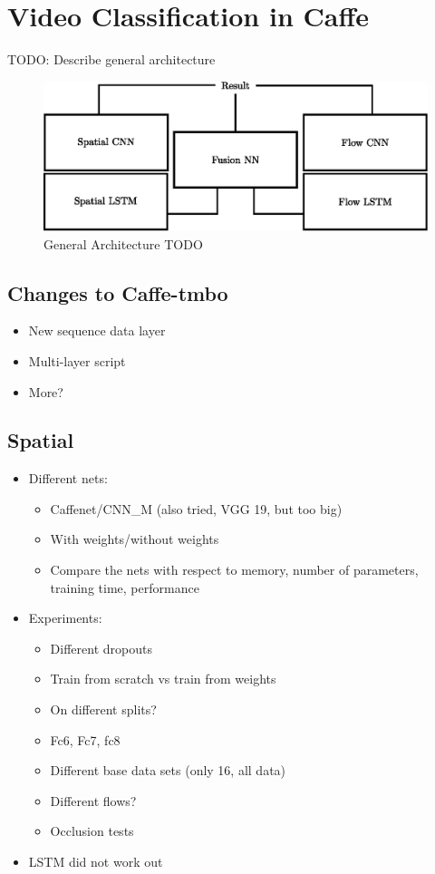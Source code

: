 \section{Video Classification in Caffe}
\label{sec:classification}

TODO: Describe general architecture
\begin{figure}[!htb]
	\centering
	\includegraphics[scale=.7]{images/architecture.eps}
	\caption{General Architecture TODO}
	\label{fig:architecture}
\end{figure}

\subsection{Changes to Caffe-tmbo}

\begin{itemize}
	\item New sequence data layer
	\item Multi-layer script
	\item More?
\end{itemize}

\subsection{Spatial}
\label{subsec:spatial}

\begin{itemize}
	\item
		Different nets:
		\begin{itemize}
			\item Caffenet/CNN\_M (also tried, VGG 19, but too big)
			\item With weights/without weights
			\item Compare the nets with respect to memory, number of parameters, training time, performance
		\end{itemize}
	\item
		Experiments:
		\begin{itemize}
			\item Different dropouts
			\item Train from scratch vs train from weights
			\item On different splits?
			\item Fc6, Fc7, fc8
			\item Different base data sets (only 16, all data)
			\item Different flows?
			\item Occlusion tests
		\end{itemize}
	\item
		LSTM did not work out
\end{itemize}


